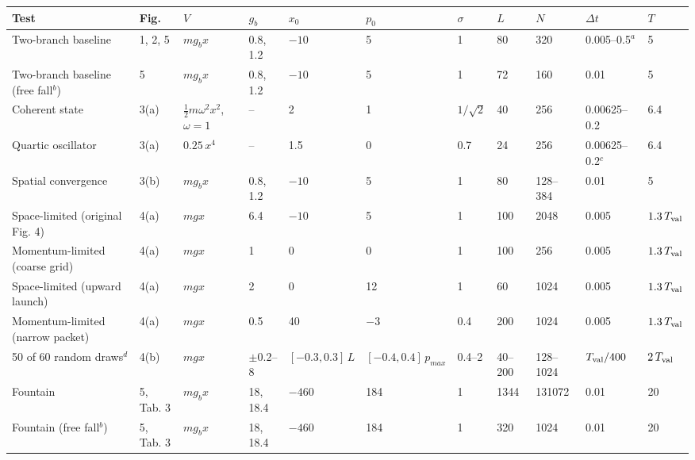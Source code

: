 \begin{tabular}{lllllllllll}
\hline
Test & Fig. & $V$ & $g_b$ & $x_0$ & $p_0$ & $\sigma$ & $L$ & $N$ & $\Delta t$ & $T$ \\
\hline
Two-branch baseline & 1, 2, 5 & $m g_b x$ & 0.8, 1.2 & $-10$ & 5 & 1 & 80 & 320 & 0.005--0.5$^a$ & 5 \\
Two-branch baseline (free fall$^b$) & 5 & $m g_b x$ & 0.8, 1.2 & $-10$ & 5 & 1 & 72 & 160 & 0.01 & 5 \\
Coherent state & 3(a) & $\tfrac12 m\omega^2x^2$, $\omega=1$ & -- & 2 & 1 & $1/\sqrt{2}$ & 40 & 256 & 0.00625--0.2 & 6.4 \\
Quartic oscillator & 3(a) & $0.25\,x^4$ & -- & 1.5 & 0 & 0.7 & 24 & 256 & 0.00625--0.2$^c$ & 6.4 \\
Spatial convergence & 3(b) & $m g_b x$ & 0.8, 1.2 & $-10$ & 5 & 1 & 80 & 128--384 & 0.01 & 5 \\
Space-limited (original Fig. 4) & 4(a) & $m g x$ & 6.4 & $-10$ & 5 & 1 & 100 & 2048 & 0.005 & $1.3\,T_{\rm val}$ \\
Momentum-limited (coarse grid) & 4(a) & $m g x$ & 1 & 0 & 0 & 1 & 100 & 256 & 0.005 & $1.3\,T_{\rm val}$ \\
Space-limited (upward launch) & 4(a) & $m g x$ & 2 & 0 & 12 & 1 & 60 & 1024 & 0.005 & $1.3\,T_{\rm val}$ \\
Momentum-limited (narrow packet) & 4(a) & $m g x$ & 0.5 & 40 & $-3$ & 0.4 & 200 & 1024 & 0.005 & $1.3\,T_{\rm val}$ \\
50 of 60 random draws$^d$ & 4(b) & $m g x$ & $\pm$0.2--8 & $[-0.3,0.3]\,L$ & $[-0.4,0.4]\,p_{max}$ & 0.4--2 & 40--200 & 128--1024 & $T_{\rm val}/400$ & $2\,T_{\rm val}$ \\
Fountain & 5, Tab. 3 & $m g_b x$ & 18, 18.4 & $-460$ & 184 & 1 & 1344 & 131072 & 0.01 & 20 \\
Fountain (free fall$^b$) & 5, Tab. 3 & $m g_b x$ & 18, 18.4 & $-460$ & 184 & 1 & 320 & 1024 & 0.01 & 20 \\
\hline
\end{tabular}
